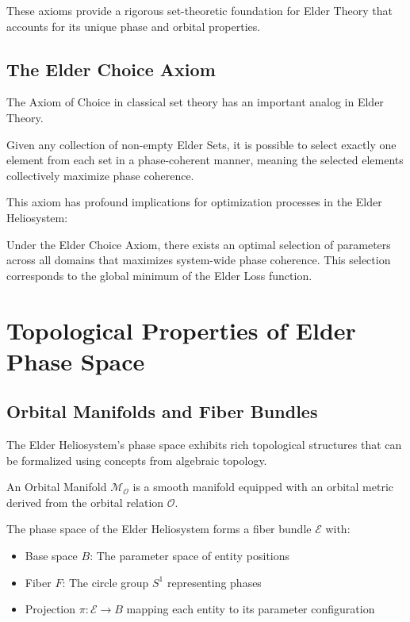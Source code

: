 These axioms provide a rigorous set-theoretic foundation for Elder Theory that accounts for its unique phase and orbital properties.

\subsection{The Elder Choice Axiom}

The Axiom of Choice in classical set theory has an important analog in Elder Theory.

\begin{axiom}
Given any collection of non-empty Elder Sets, it is possible to select exactly one element from each set in a phase-coherent manner, meaning the selected elements collectively maximize phase coherence.
\end{axiom}

This axiom has profound implications for optimization processes in the Elder Heliosystem:

\begin{theorem}
Under the Elder Choice Axiom, there exists an optimal selection of parameters across all domains that maximizes system-wide phase coherence. This selection corresponds to the global minimum of the Elder Loss function.
\end{theorem}

\section{Topological Properties of Elder Phase Space}

\subsection{Orbital Manifolds and Fiber Bundles}

The Elder Heliosystem's phase space exhibits rich topological structures that can be formalized using concepts from algebraic topology.

\begin{definition}
An Orbital Manifold $\mathcal{M}_{\mathcal{O}}$ is a smooth manifold equipped with an orbital metric derived from the orbital relation $\mathcal{O}$.
\end{definition}

\begin{theorem}
The phase space of the Elder Heliosystem forms a fiber bundle $\mathcal{E}$ with:
\begin{itemize}
    \item Base space $B$: The parameter space of entity positions
    \item Fiber $F$: The circle group $S^1$ representing phases
    \item Projection $\pi: \mathcal{E} \to B$ mapping each entity to its parameter configuration
\end{itemize}
\end{theorem}

